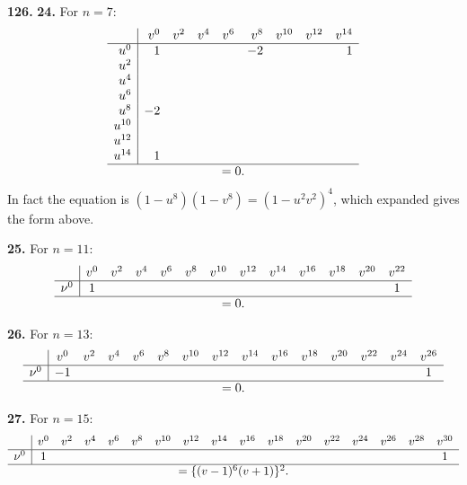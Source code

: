 \documentclass[11pt,a4paper]{book}
\begin{document}
\noindent\textbf{126.} \textbf{24.} For $n = 7$:
\[
\begin{array}{r|rrrrrrrr}
& v^0 & v^2 & v^4 & v^6 & v^8 & v^{10} & v^{12} & v^{14} \\
\hline
u^0 & 1 & & & & -2 & & & 1 \\
u^2 & & & & & & & & \\
u^4 & & & & & & & & \\
u^6 & & & & & & & & \\
u^8 & -2 & & & & & & & \\
u^{10} & & & & & & & & \\
u^{12} & & & & & & & & \\
u^{14} & 1 & & & & & & & \\
\hline
\multicolumn{9}{c}{= 0.}
\end{array}
\]
In fact the equation is $(1 - u^8)(1 - v^8) = (1 - u^2v^2)^4$, which expanded gives the form above.

\medskip
\noindent\textbf{25.} For $n = 11$:
\[
\begin{array}{r|cccccccccccc}
& v^0 & v^2 & v^4 & v^6 & v^8 & v^{10} & v^{12} & v^{14} & v^{16} & v^{18} & v^{20} & v^{22} \\
\hline
\nu^0 & 1 & & & & & & & & & & & 1 \\
\hline
\multicolumn{13}{c}{= 0.}
\end{array}
\]

\medskip
\noindent\textbf{26.} For $n = 13$:
\[
\begin{array}{r|cccccccccccccc}
& v^0 & v^2 & v^4 & v^6 & v^8 & v^{10} & v^{12} & v^{14} & v^{16} & v^{18} & v^{20} & v^{22} & v^{24} & v^{26} \\
\hline
\nu^0 & -1 & & & & & & & & & & & & & 1 \\
\hline
\multicolumn{15}{c}{= 0.}
\end{array}
\]

\medskip
\noindent\textbf{27.} For $n = 15$:
\[
\begin{array}{r|cccccccccccccccc}
& v^0 & v^2 & v^4 & v^6 & v^8 & v^{10} & v^{12} & v^{14} & v^{16} & v^{18} & v^{20} & v^{22} & v^{24} & v^{26} & v^{28} & v^{30} \\
\hline
\nu^0 & 1 & & & & & & & & & & & & & & & 1 \\
\hline
\multicolumn{17}{c}{= \{(v - 1)^6(v + 1)\}^2.}
\end{array}
\]
\end{document}
